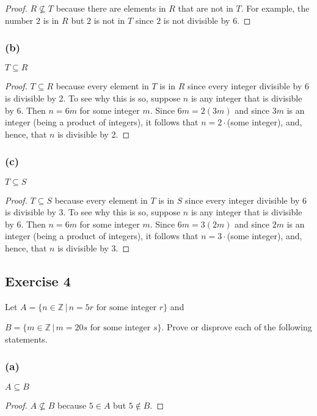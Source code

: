 \documentclass[14pt]{extarticle}
\newcommand{\Z}{\mathbb{Z}}
\begin{document}
\begin{proof}
  \(R \nsubseteq T\) because there are elements in $R$ that are not in $T$. For example, the number $2$ is in $R$ but
  $2$ is not in $T$ since $2$ is not divisible by $6$.
\end{proof}

\subsubsection{(b)}
\(T \subseteq R\)

\begin{proof}
  \(T \subseteq R\) because every element in $T$ is in $R$ since every integer divisible by 6 is divisible by 2. To
  see why this is so, suppose $n$ is any integer that is divisible by 6. Then $n = 6m$ for some integer $m$. Since
  \(6m = 2(3m)\) and since $3m$ is an integer (being a product of integers), it follows that \(n = 2 \cdot \)(some
  integer), and, hence, that $n$ is divisible by 2.
\end{proof}

\subsubsection{(c)}
\(T \subseteq S\)

\begin{proof}
  \(T \subseteq S\) because every element in $T$ is in $S$ since every integer divisible by 6 is divisible by 3. To
  see why this is so, suppose $n$ is any integer that is divisible by 6. Then $n = 6m$ for some integer $m$. Since
  \(6m = 3(2m)\) and since $2m$ is an integer (being a product of integers), it follows that \(n = 3 \cdot \)(some
  integer), and, hence, that $n$ is divisible by 3.
\end{proof}

\subsection{Exercise 4}
Let \(A = \{n \in \Z \, | \, n = 5r \text{ for some integer } r\}\) and

\(B = \{m \in \Z \, | \, m = 20s \text{ for some integer } s\}\). Prove or disprove each of the following statements.

\subsubsection{(a)}
\(A \subseteq B\)

\begin{proof}
  \(A \nsubseteq B\) because $5 \in A$ but $5 \notin B$.
\end{proof}
\end{document}
